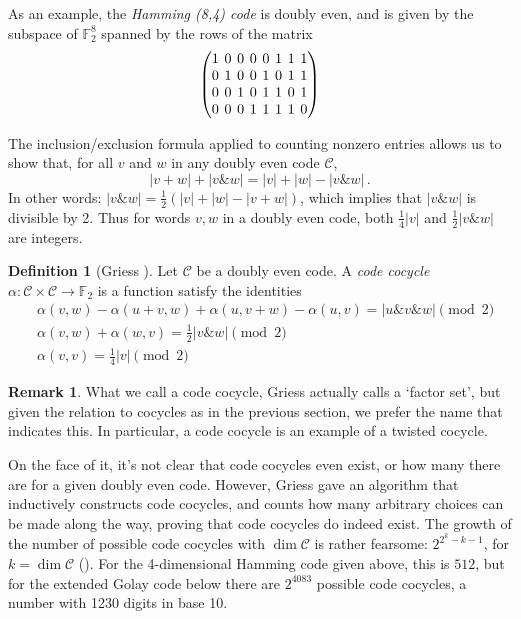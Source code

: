 \documentclass{article}
\theoremstyle{plain}
\theoremstyle{definition}
\newtheorem*{definition}{Definition}
\newtheorem*{remark}{Remark}
\def \cC {\mathcal{C}}
\def \FF {\mathbb{F}}
\newcommand{\AND}{\mathbin{\texttt{\&}}}
\begin{document}
As an example, the \emph{Hamming (8,4) code} is doubly even, and is given by the subspace of $\FF_2^8$ spanned by the rows of the matrix
\[
\begingroup %
\setlength\arraycolsep{2pt}
\begin{pmatrix}
1&0&0&0&0&1&1&1\\
0&1&0&0&1&0&1&1\\
0&0&1&0&1&1&0&1\\
0&0&0&1&1&1&1&0
\end{pmatrix}
\endgroup
\]

The inclusion/exclusion formula applied to counting nonzero entries allows us to show that, for all $v$ and $w$ in any doubly even code $\cC$,
\[
	|v+w| + |v\AND w| = |v| + |w| - |v\AND w|\,.
\]
In other words: $|v\AND w| = \frac12(|v| + |w| - |v+w|)$, which implies that $|v\AND w|$ is divisible by 2.
Thus for words $v,w$ in a doubly even code, both $\frac14|v|$ and $\frac12|v\AND w|$ are integers.

\begin{definition}[Griess \cite{Griess}]
Let $\cC$ be a doubly even code. 
A \emph{code cocycle} $\alpha\colon \cC \times \cC \to \FF_2$ is a  function satisfy the identities
\begin{align}
& \alpha(v,w)-\alpha(u+v,w)+\alpha(u,v+w)-\alpha(u,v) =|u\AND v \AND w| \pmod 2 \label{eq: code cocycle 1}\\
& \alpha(v,w)+\alpha(w,v) = {}  \tfrac12|v\AND w| \pmod 2 \label{eq: code cocycle 2}\\
& \alpha(v,v) = {}  \tfrac14|v| \pmod 2\label{eq: code cocycle 3}
\end{align}
\end{definition}

\begin{remark}
What we call a code cocycle, Griess actually calls a `factor set', but given the relation to cocycles as in the previous section, we prefer the name that indicates this.
In particular, a code cocycle is an example of a twisted cocycle.
\end{remark}

On the face of it, it's not clear that code cocycles even exist, or how many there are for a given doubly even code. 
However, Griess gave an algorithm that inductively constructs code cocycles, and counts how many arbitrary choices can be made along the way, proving that code cocycles do indeed exist.
The growth of the number of possible code cocycles with $\dim \cC$ is rather fearsome: $2^{2^k-k-1}$, for $k=\dim \cC$ (\cite[Theorem 10]{Griess}).
For the 4-dimensional Hamming code given above, this is $512$, but for the extended Golay code below there are $2^{4083}$ possible code cocycles, a number with 1230 digits in base 10.
\end{document}
